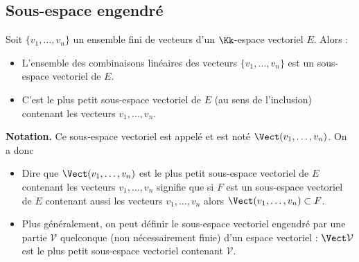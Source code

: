 \documentclass[class=report,crop=false]{standalone}
\begin{document}
\subsection{Sous-espace engendré}

\begin{theoreme}
\label{th:engendre}
Soit  $\{v_1, \dots , v_n\}$ un ensemble fini de vecteurs d'un
$\Kk$-espace vectoriel $E$.
Alors :
\begin{itemize}
  \item L'ensemble des combinaisons linéaires des vecteurs
  $\{v_1, \dots , v_n\}$ est un sous-espace vectoriel de $E$.
  \item C'est le plus petit sous-espace vectoriel de $E$
  (au sens de l'inclusion) contenant les vecteurs  $v_1, \ldots , v_n$.
\end{itemize}

\end{theoreme}



\textbf{Notation.}
Ce sous-espace vectoriel est appelé 
 et est
 noté $\Vect (v_1, \dots , v_n )$.  On a donc



\begin{remarque*}
\sauteligne
\begin{itemize}
  \item Dire que $\Vect (v_1, \dots , v_n )$ est le plus petit sous-espace vectoriel de $E$
contenant les vecteurs  $v_1, \ldots , v_n$ signifie que si
$F$ est un sous-espace vectoriel de $E$ contenant aussi les vecteurs $v_1, \ldots , v_n$
alors $\Vect (v_1, \dots , v_n ) \subset F$.

  \item Plus généralement, on peut définir le sous-espace vectoriel engendré
par une partie $\mathcal{V}$ quelconque (non nécessairement finie)
d'un espace vectoriel : $\Vect \mathcal{V}$ est le plus petit
sous-espace vectoriel contenant $\mathcal{V}$.
\end{itemize}
\end{remarque*}
\end{document}
